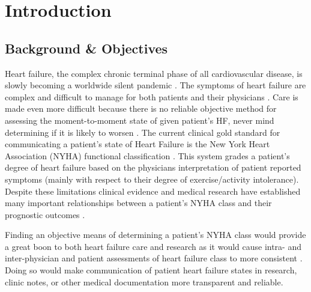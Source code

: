 \documentclass[]{article}
\begin{document}
\clearpage

\section{Introduction}
\subsection{Background \& Objectives} %

Heart failure, the complex chronic terminal phase of all cardiovascular disease, is slowly becoming a worldwide silent pandemic \cite{Mehra2015}. The symptoms of heart failure are complex and difficult to manage for both patients and their physicians \cite{HeartandStrokeFoundation2016,Seto2011,Lawrence2016}. Care is made even more difficult because there is no reliable objective method for assessing the moment-to-moment state of given patient’s HF, never mind determining if it is likely to worsen \cite{Cox1992,Raphael2007,Bennett2002}. The current clinical gold standard for communicating a patient’s state of Heart Failure is the New York Heart Association (NYHA) functional classification \cite{HeartFoundation2014,AmericanHeartAssociation2015}. This system grades a patient's degree of heart failure based on the physicians interpretation of patient reported symptoms (mainly with respect to their degree of exercise/activity intolerance). Despite these limitations clinical evidence and medical research have established many important relationships between a patient's NYHA class and their prognostic outcomes \cite{Bennett2002,Ahmed2006}. 

Finding an objective means of determining a patient's NYHA class would provide a great boon to both heart failure care and research as it would cause intra- and inter-physician and patient assessments of heart failure class to more consistent \cite{Goldman1981,Bennett2002, Williams2017}. Doing so would make communication of patient heart failure states in research, clinic notes, or other medical documentation more transparent and reliable.
\end{document}
